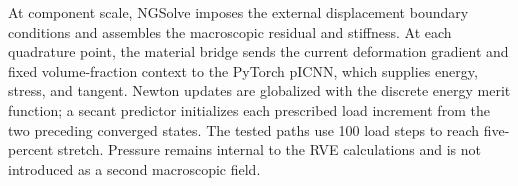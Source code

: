 At component scale, NGSolve imposes the external displacement boundary
conditions and assembles the macroscopic residual and stiffness. At each
quadrature point, the material bridge sends the current deformation gradient
and fixed volume-fraction context to the PyTorch pICNN, which supplies
energy, stress, and tangent. Newton updates are globalized with the discrete
energy merit function; a secant predictor initializes each prescribed load
increment from the two preceding converged states. The tested paths use
100 load steps to reach five-percent stretch. Pressure remains internal to
the RVE calculations and is not introduced as a second macroscopic field.
